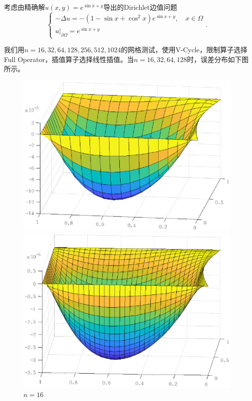\documentclass[lang=cn,10pt]{elegantbook}
\begin{document}
考虑由精确解$u(x,y)=e^{\sin x+y}$导出的Dirichlet边值问题
\begin{equation}
  \left\{
    \begin{array}{l}
      -\Delta u = -(1-\sin x+\cos^2 x)e^{\sin x + y},\quad x\in\Omega \\
      u|_{\partial \Omega}=e^{\sin x + y}
    \end{array}
  \right. .
\end{equation}

我们用$n=16,32,64,128,256,512,1024$的网格测试，使用V-Cycle，限制算子选择Full Operator，插值算子选择线性插值。当$n=16,32,64,128$时，误差分布如下图所示。
\begin{figure}[H]
  \centering
  \begin{minipage}[t]{0.24\linewidth}
      \centering
      \includegraphics[width=0.95\linewidth]{figure/3-1-1.eps}
      \caption*{$n=16$}
  \end{minipage}
  \begin{minipage}[t]{0.24\linewidth}
    \centering
    \includegraphics[width=0.95\linewidth]{figure/3-1-2.eps}

\end{minipage}
\end{figure}
\end{document}
